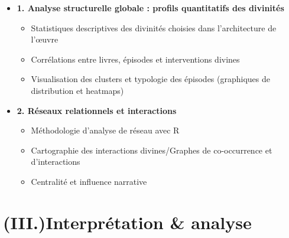 \documentclass[
  letterpaper,
  DIV=11,
  numbers=noendperiod]{scrreprt}
\providecommand{\tightlist}{%
  \setlength{\itemsep}{0pt}\setlength{\parskip}{0pt}}\usepackage{longtable,booktabs,array}
\begin{document}
\begin{itemize}
\tightlist
\item
  \textbf{1. Analyse structurelle globale : profils quantitatifs des
  divinités}

  \begin{itemize}
  \tightlist
  \item
    Statistiques descriptives des divinités choisies dans l'architecture
    de l'œuvre
  \item
    Corrélations entre livres, épisodes et interventions divines
  \item
    Visualisation des clusters et typologie des épisodes (graphiques de
    distribution et heatmaps)
  \end{itemize}
\item
  \textbf{2. Réseaux relationnels et interactions}

  \begin{itemize}
  \tightlist
  \item
    Méthodologie d'analyse de réseau avec R
  \item
    Cartographie des interactions divines/Graphes de co-occurrence et
    d'interactions
  \item
    Centralité et influence narrative
  \end{itemize}
\end{itemize}

\section{\texorpdfstring{\textbf{(III.)Interprétation \&
analyse}}{(III.)Interprétation \& analyse}}\label{iii.interpruxe9tation-analyse}
\end{document}
